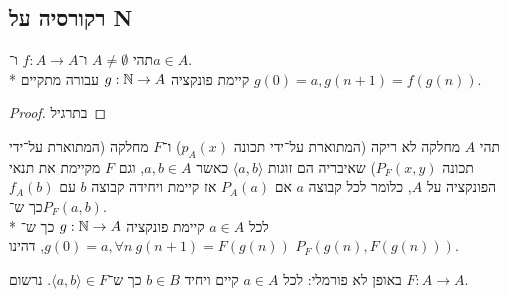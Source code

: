 \subsection{רקורסיה על N}
\begin{theorem}[רקורסיה]
	תהי $A \ne \emptyset$ ו־$f : A \to A$ ו־$a \in A$. \\*
	קיימת פונקציה $g : \mathbb{N} \to A$ עבורה מתקיים $g(0) = a, g(n + 1) = f(g(n))$.
\end{theorem}
\begin{proof}
	בתרגיל
\end{proof}
\begin{theorem}
	תהי $A$ מחלקה לא ריקה (המתוארת על־ידי תכונה $p_A(x)$) ו־$F$ מחלקה (המתוארת על־ידי תכונה $P_F(x, y)$) שאיבריה הם זוגות $\langle a, b \rangle$ כאשר $a, b \in A$,
	וגם $F$ מקיימת את תנאי הפונקציה על $A$, כלומר לכל קבוצה $a$ אם $P_A(a)$ אז קיימת ויחידה קבוצה $b$ עם $f_A(b)$ כך ש־$P_F(a, b)$. \\*
	לכל $a \in A$ קיימת פונקציה $g : \mathbb{N} \to A$ כך ש־$g(0) = a, \forall n\ g(n + 1) = F(g(n))$, דהינו $P_F(g(n), F(g(n)))$.
\end{theorem}
באופן לא פורמלי: לכל $a \in A$ קיים ויחיד $b \in B$ כך ש־$\langle a, b \rangle \in F$. נרשום $F : A \to A$.

